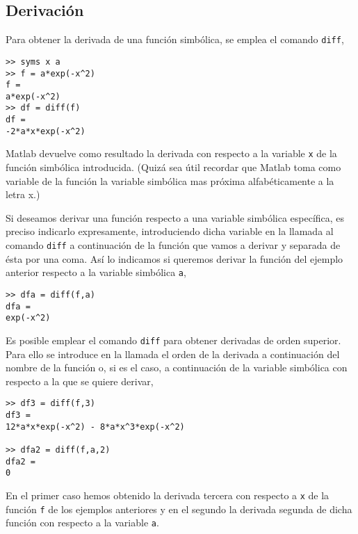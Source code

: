 \subsection{Derivación}
Para obtener la derivada de una función simbólica, se emplea el comando \texttt{diff},
\begin{verbatim}
>> syms x a
>> f = a*exp(-x^2) 
f = 
a*exp(-x^2) 
>> df = diff(f) 
df = 
-2*a*x*exp(-x^2) 
\end{verbatim}
Matlab devuelve como resultado la derivada con respecto a la variable \texttt{x} de la función simbólica introducida. (Quizá sea útil recordar que Matlab toma como variable de la función la variable simbólica mas próxima alfabéticamente a la letra x.)

Si deseamos derivar una función respecto a una variable simbólica específica, es preciso indicarlo expresamente, introduciendo dicha variable en la llamada al comando \texttt{diff} a continuación de la función que vamos a derivar y separada de ésta por una coma. Así lo indicamos si queremos derivar la función del ejemplo anterior respecto a la variable simbólica \texttt{a},

\begin{verbatim}
>> dfa = diff(f,a) 
dfa = 
exp(-x^2)
\end{verbatim}

Es posible emplear el comando \texttt{diff} para obtener derivadas de orden superior. Para ello se introduce en la llamada el orden de la derivada a continuación del nombre de la función o, si es el caso, a continuación de la variable simbólica con respecto a la que se quiere derivar,

\begin{verbatim}
>> df3 = diff(f,3) 
df3 = 
12*a*x*exp(-x^2) - 8*a*x^3*exp(-x^2)
 
>> dfa2 = diff(f,a,2) 
dfa2 = 
0
\end{verbatim}

En el primer caso hemos obtenido la derivada tercera con respecto a \texttt{x} de la función \texttt{f} de los ejemplos anteriores y en el segundo la derivada segunda de dicha función con respecto a la variable \texttt{a}. 

